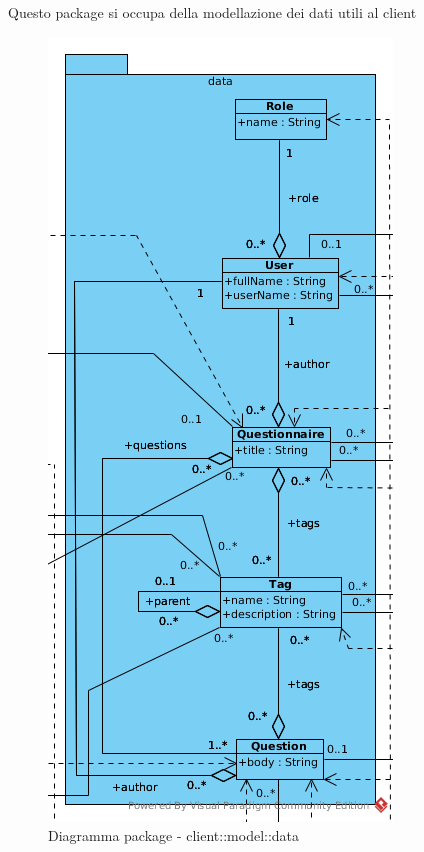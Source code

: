 Questo package si occupa della modellazione dei dati utili al client\begin{center}
		\begin{figure}[H]
			\centering \includegraphics[scale=4, max width=\textwidth, max height=\myheight]{../img/diagrammiClassi/client/model/data.png}
			\caption{Diagramma package - client::model::data}
		\end{figure}
	\end{center}\hypertarget{client::model::data::Questionnaire}{}
